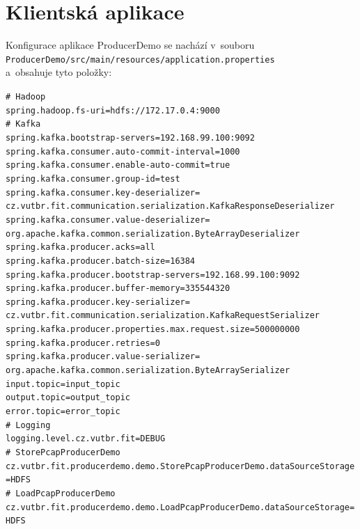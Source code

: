 \section{Klientská aplikace}
Konfigurace aplikace ProducerDemo se nachází v~souboru \\
\texttt{ProducerDemo/src/main/resources/application.properties} \\
a~obsahuje tyto položky:

\vspace{0.5cm}
\noindent \texttt{\#   Hadoop \\
spring.hadoop.fs-uri=hdfs://172.17.0.4:9000 \\
\#   Kafka \\
spring.kafka.bootstrap-servers=192.168.99.100:9092 \\
spring.kafka.consumer.auto-commit-interval=1000 \\
spring.kafka.consumer.enable-auto-commit=true \\
spring.kafka.consumer.group-id=test \\
spring.kafka.consumer.key-deserializer= \\
\indent cz.vutbr.fit.communication.serialization.KafkaResponseDeserializer \\
spring.kafka.consumer.value-deserializer= \\
\indent org.apache.kafka.common.serialization.ByteArrayDeserializer \\
spring.kafka.producer.acks=all \\
spring.kafka.producer.batch-size=16384 \\
spring.kafka.producer.bootstrap-servers=192.168.99.100:9092 \\
spring.kafka.producer.buffer-memory=335544320 \\
spring.kafka.producer.key-serializer= \\
\indent cz.vutbr.fit.communication.serialization.KafkaRequestSerializer \\
spring.kafka.producer.properties.max.request.size=500000000 \\
spring.kafka.producer.retries=0 \\
spring.kafka.producer.value-serializer= \\
\indent org.apache.kafka.common.serialization.ByteArraySerializer \\
input.topic=input\_topic \\
output.topic=output\_topic \\
error.topic=error\_topic \\
\#   Logging \\
logging.level.cz.vutbr.fit=DEBUG \\
\#   StorePcapProducerDemo \\
cz.vutbr.fit.producerdemo.demo.StorePcapProducerDemo.dataSourceStorage=HDFS \\
\#   LoadPcapProducerDemo \\
cz.vutbr.fit.producerdemo.demo.LoadPcapProducerDemo.dataSourceStorage=HDFS
}

